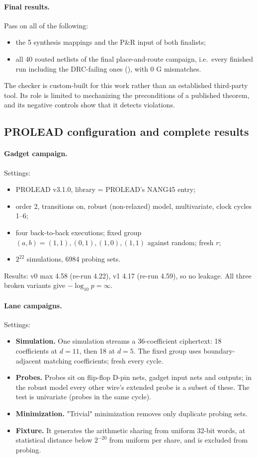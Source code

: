 \paragraph{Final results.} Pass on all of the following:
\begin{itemize}
  \item the 5 synthesis mappings and the P\&R input of both finalists;
  \item all 40 routed netlists of the final place-and-route campaign, i.e.\ every finished run including the DRC-failing ones (), with 0 G mismatches.
\end{itemize}
The checker is custom-built for this work rather than an established third-party tool. Its role is limited to mechanizing the preconditions of a published theorem, and its negative controls show that it detects violations.

\subsection{PROLEAD configuration and complete results}\label{app:prolead}
\paragraph{Gadget campaign.} Settings:
\begin{itemize}
  \item PROLEAD v3.1.0, library = PROLEAD's NANG45 entry;
  \item order 2, transitions on, robust (non-relaxed) model, multivariate, clock cycles 1--6;
  \item four back-to-back executions; fixed group $(a, b) = (1,1), (0,1), (1,0), (1,1)$ against random; fresh $r$;
  \item $2^{22}$ simulations, \num{6984} probing sets.
\end{itemize}
Results: v0 max 4.58 (re-run 4.22), v1 4.17 (re-run 4.59), so no leakage. All three broken variants give $-\log_{10} p = \infty$.

\paragraph{Lane campaigns.} Settings:
\begin{itemize}
  \item \textbf{Simulation.} One simulation streams a 36-coefficient ciphertext: 18 coefficients at $d = 11$, then 18 at $d = 5$. The fixed group uses boundary-adjacent matching coefficients; fresh  every cycle.
  \item \textbf{Probes.} Probes sit on flip-flop D-pin nets, gadget input nets and outputs; in the robust model every other wire's extended probe is a subset of these. The test is univariate (probes in the same cycle).
  \item \textbf{Minimization.} "Trivial" minimization removes only duplicate probing sets.
  \item \textbf{Fixture.} It generates the arithmetic sharing from uniform 32-bit words, at statistical distance below $2^{-20}$ from uniform per share, and is excluded from probing.
\end{itemize}

